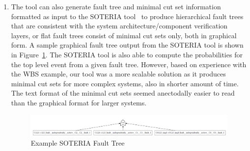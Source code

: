 \begin{enumerate}
\item The tool can also generate fault tree and minimal cut set information formatted as input to the SOTERIA tool~\cite{manolios2019model} to produce hierarchical fault trees that are consistent with the system architecture/component verification layers, or flat fault trees consist of minimal cut sets only, both in graphical form. A sample graphical fault tree output from the SOTERIA tool is shown in Figure~\ref{fig:soteriaFT}. The SOTERIA tool is also able to compute the probabilities for the top level event from a given fault tree. However, based on experience with the WBS example, our tool was a more scalable solution as it produces minimal cut sets for more complex systems, also in shorter amount of time. The text format of the minimal cut sets seemed anectodally easier to read than the graphical format for larger systems.  

\begin{figure}[htbp]
	\vspace{-0.1in} 
	\begin{center}
		\includegraphics[scale=0.2]{images/Soteria_FT.png}
		\caption{Example SOTERIA Fault Tree}
		\label{fig:soteriaFT}
	\end{center}
\end{figure}
\end{enumerate}

